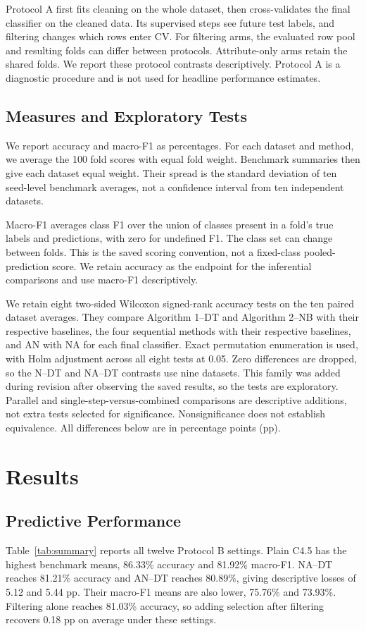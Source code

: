 \documentclass[conference,a4paper]{IEEEtran}
\begin{document}
Protocol A first fits cleaning on the whole dataset, then cross-validates the final classifier on the cleaned data. Its supervised steps see future test labels, and filtering changes which rows enter CV. For filtering arms, the evaluated row pool and resulting folds can differ between protocols. Attribute-only arms retain the shared folds. We report these protocol contrasts descriptively. Protocol A is a diagnostic procedure and is not used for headline performance estimates.

\subsection{Measures and Exploratory Tests}
We report accuracy and macro-F1 as percentages. For each dataset and method, we average the 100 fold scores with equal fold weight. Benchmark summaries then give each dataset equal weight. Their spread is the standard deviation of ten seed-level benchmark averages, not a confidence interval from ten independent datasets.

Macro-F1 averages class F1 over the union of classes present in a fold's true labels and predictions, with zero for undefined F1. The class set can change between folds. This is the saved scoring convention, not a fixed-class pooled-prediction score. We retain accuracy as the endpoint for the inferential comparisons and use macro-F1 descriptively.

We retain eight two-sided Wilcoxon signed-rank accuracy tests on the ten paired dataset averages. They compare Algorithm 1--DT and Algorithm 2--NB with their respective baselines, the four sequential methods with their respective baselines, and AN with NA for each final classifier. Exact permutation enumeration is used, with Holm adjustment across all eight tests at 0.05. Zero differences are dropped, so the N--DT and NA--DT contrasts use nine datasets. This family was added during revision after observing the saved results, so the tests are exploratory. Parallel and single-step-versus-combined comparisons are descriptive additions, not extra tests selected for significance. Nonsignificance does not establish equivalence. All differences below are in percentage points (pp).

\section{Results}
\subsection{Predictive Performance}
Table~\ref{tab:summary} reports all twelve Protocol B settings. Plain C4.5 has the highest benchmark means, 86.33\% accuracy and 81.92\% macro-F1. NA--DT reaches 81.21\% accuracy and AN--DT reaches 80.89\%, giving descriptive losses of 5.12 and 5.44 pp. Their macro-F1 means are also lower, 75.76\% and 73.93\%. Filtering alone reaches 81.03\% accuracy, so adding selection after filtering recovers 0.18 pp on average under these settings.
\end{document}

